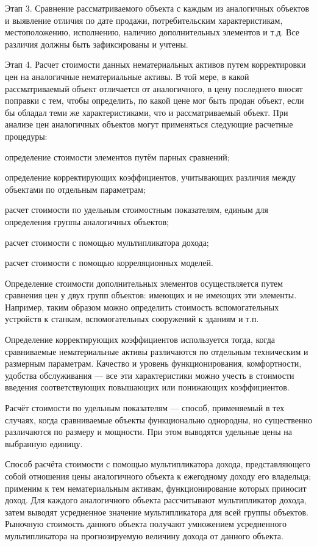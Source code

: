 Этап 3. Сравнение рассматриваемого объекта с каждым из аналогичных объектов и выявление отличия по дате продажи, потребительским характеристикам, местоположению, исполнению, наличию дополнительных элементов и т.д. Все различия должны быть зафиксированы и учтены.

Этап 4. Расчет стоимости данных нематериальных активов путем корректировки цен на аналогичные нематериальные активы. В той мере, в какой рассматриваемый объект отличается от аналогичного, в цену последнего вносят поправки с тем, чтобы определить, по какой цене мог быть продан объект, если бы обладал теми же характеристиками, что и рассматриваемый объект. При анализе цен аналогичных объектов могут применяться следующие расчетные процедуры:

\begin{list}{}{\leftmargin=1.5cm}
	\item определение стоимости элементов путём парных сравнений;
	\item определение корректирующих коэффициентов, учитывающих различия между объектами по отдельным параметрам;
	\item расчет стоимости по удельным стоимостным показателям, единым для определения группы аналогичных объектов;
	\item расчет стоимости с помощью мультипликатора дохода;
	\item расчет стоимости с помощью корреляционных моделей.
\end{list}

Определение стоимости дополнительных элементов осуществляется путем сравнения цен у двух групп объектов: имеющих и не имеющих эти элементы. Например, таким образом можно определить стоимость вспомогательных устройств к станкам, вспомогательных сооружений к зданиям и т.п.

Определение корректирующих коэффициентов используется тогда, когда сравниваемые нематериальные активы различаются по отдельным техническим и размерным параметрам. Качество и уровень функционирования, комфортности, удобства обслуживания --- все эти характеристики можно учесть в стоимости введения соответствующих повышающих или понижающих коэффициентов.

Расчёт стоимости по удельным показателям --- способ, применяемый в тех случаях, когда сравниваемые объекты функционально однородны, но существенно различаются по размеру и мощности. При этом выводятся удельные цены на выбранную единицу. 

Способ расчёта стоимости с помощью мультипликатора дохода, представляющего собой отношения цены аналогичного объекта к ежегодному доходу его владельца; применим к тем нематериальным активам, функционирование которых приносит доход. Для каждого аналогичного объекта рассчитывают мультипликатор дохода, затем выводят усредненное значение мультипликатора для всей группы объектов. Рыночную стоимость данного объекта получают умножением усредненного мультипликатора на прогнозируемую величину дохода от данного объекта.

